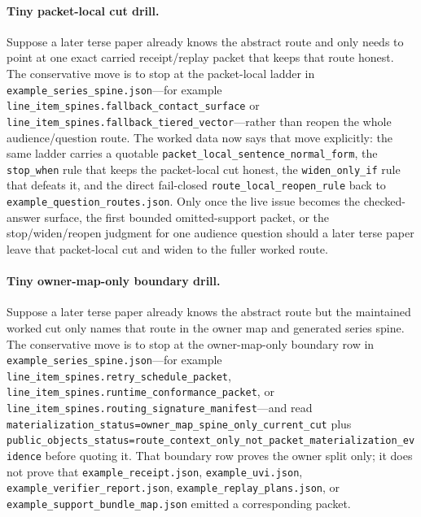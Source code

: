 \documentclass[11pt]{article}
\begin{document}
\paragraph{Tiny packet-local cut drill.}
Suppose a later terse paper already knows the abstract route and only needs to point at one exact carried receipt/replay packet that keeps that route honest. The conservative move is to stop at the packet-local ladder in \nolinkurl{example\_series\_spine.json}---for example \nolinkurl{line\_item\_spines.fallback\_contact\_surface} or \nolinkurl{line\_item\_spines.fallback\_tiered\_vector}---rather than reopen the whole audience/question route. The worked data now says that move explicitly: the same ladder carries a quotable \texttt{packet\_local\_sentence\_normal\_form}, the \texttt{stop\_when} rule that keeps the packet-local cut honest, the \texttt{widen\_only\_if} rule that defeats it, and the direct fail-closed \texttt{route\_local\_reopen\_rule} back to \texttt{example\_question\_routes.json}. Only once the live issue becomes the checked-answer surface, the first bounded omitted-support packet, or the stop/widen/reopen judgment for one audience question should a later terse paper leave that packet-local cut and widen to the fuller worked route.\cite{series:workedexample}

\paragraph{Tiny owner-map-only boundary drill.}
Suppose a later terse paper already knows the abstract route but the maintained worked cut only names that route in the owner map and generated series spine. The conservative move is to stop at the owner-map-only boundary row in \nolinkurl{example\_series\_spine.json}---for example \nolinkurl{line\_item\_spines.retry\_schedule\_packet}, \nolinkurl{line\_item\_spines.runtime\_conformance\_packet}, or \nolinkurl{line\_item\_spines.routing\_signature\_manifest}---and read \texttt{materialization\_status=owner\_map\_spine\_only\_current\_cut} plus \texttt{public\_objects\_status=route\_context\_only\_not\_packet\_materialization\_evidence} before quoting it. That boundary row proves the owner split only; it does not prove that \nolinkurl{example\_receipt.json}, \nolinkurl{example\_uvi.json}, \nolinkurl{example\_verifier\_report.json}, \nolinkurl{example\_replay\_plans.json}, or \nolinkurl{example\_support\_bundle\_map.json} emitted a corresponding packet.\cite{series:workedexample}
\end{document}
